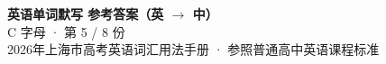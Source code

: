 \documentclass[10pt,a4paper]{article}
\begin{document}
\pagestyle{plain}

\begin{center}
{\LARGE\bfseries 英语单词默写 \quad 参考答案（英 $\to$ 中）}\\[0.22em]
{\large C 字母 · 第 5 / 8 份}\\[0.18em]
{\small 2026年上海市高考英语词汇用法手册 · 参照普通高中英语课程标准}
\end{center}

\vspace{0.2em}
\noindent{\color{rulegray}\rule{\textwidth}{0.8pt}}

\vspace{0.35em}

\vspace{0.25em}
\renewcommand{\arraystretch}{1.32}
\end{document}

